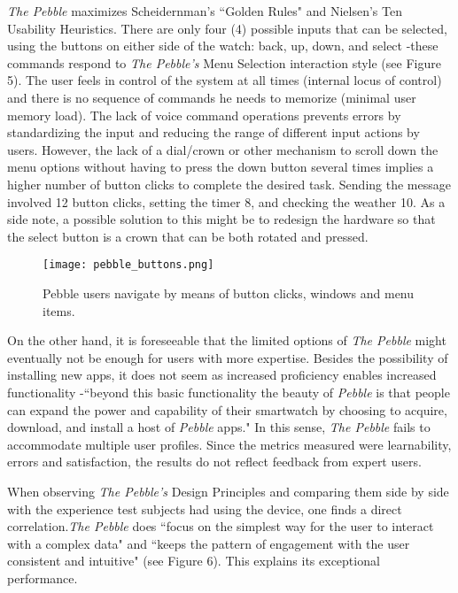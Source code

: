\documentclass[11pt,a4paper]{scrartcl}
\begin{document}
\textit{The Pebble} maximizes Scheidernman's ``Golden Rules" and Nielsen's Ten Usability Heuristics. \cite{plaisant09} There are only four (4) possible inputs that can be selected, using the buttons on either side of the watch: back, up, down, and select -these commands respond to \textit{The Pebble's} Menu Selection interaction style (see Figure 5). The user feels in control of the system at all times (internal locus of control) and there is no sequence of commands he needs to memorize (minimal user memory load). The lack of voice command operations prevents errors by standardizing the input and reducing the range of different input actions by users. However, the lack of a dial/crown or other mechanism to scroll down the menu options without having to press the down button several times implies a higher number of button clicks to complete the desired task. Sending the message involved 12 button clicks, setting the timer 8, and checking the weather 10. As a side note, a possible solution to this might be to redesign the hardware so that the select button is a crown that can be both rotated and pressed.

\begin{figure}[h]
\centering
\texttt{[image: pebble\_buttons.png]}
\caption{Pebble users navigate by means of button clicks, windows and menu items.}
\end{figure}

On the other hand, it is foreseeable that the limited options of \textit{The Pebble} might eventually not be enough for users with more expertise. Besides the possibility of installing new apps, it does not seem as increased proficiency enables increased functionality -``beyond this basic functionality the beauty of \textit{Pebble} is that people can expand the power and capability of their smartwatch by choosing to acquire, download, and install a host of \textit{Pebble} apps."\cite{pebble01}  In this sense, \textit{The Pebble} fails to accommodate multiple user profiles. Since the metrics measured were learnability, errors and satisfaction, the results do not reflect feedback from expert users. 

When observing \textit{The Pebble's} Design Principles and comparing them side by side with the experience test subjects had using the device, one finds a direct correlation.\textit{The Pebble} does ``focus on the simplest way for the user to interact with a complex data" and ``keeps the pattern of engagement with the user consistent and intuitive" (see Figure 6). This explains its exceptional performance. 
\end{document}
